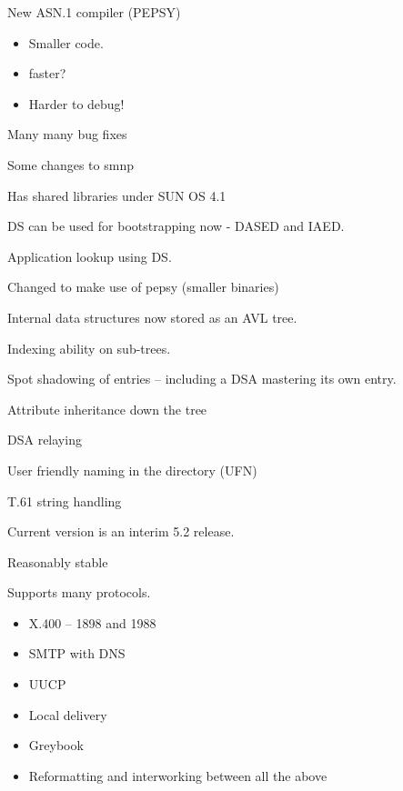 \begin{bwslide}
\begin{nrtc}
\item	New ASN.1 compiler (PEPSY)
	\begin{itemize}
	\item	Smaller code.
	\item	faster?
	\item Harder to debug!
	\end{itemize}
\item	Many many bug fixes
\item	Some changes to smnp
\item	Has shared libraries under SUN OS 4.1
\item	DS can be used for bootstrapping now - DASED and IAED.
\item	Application lookup using DS.
\end{nrtc}
\end{bwslide}

\begin{bwslide}
\begin{nrtc}
\item	Changed to make use of pepsy (smaller binaries)
\item	Internal data structures now stored as an AVL tree.
\item	Indexing ability on sub-trees.
\item	Spot shadowing of entries -- including a DSA mastering its own entry.
\item	Attribute inheritance down the tree
\item	DSA relaying
\item	User friendly naming in the directory (UFN)
\item	T.61 string handling
\end{nrtc}
\end{bwslide}

\begin{bwslide}
\begin{nrtc}
\item	Current version is an interim 5.2 release.
\item	Reasonably stable
\item	Supports many protocols.
	\begin{itemize}
	\item	X.400 -- 1898 and 1988
	\item	SMTP with DNS
	\item	UUCP
	\item	Local delivery
	\item	Greybook
	\item	Reformatting and interworking between all the above
	\end{itemize}
\end{nrtc}
\end{bwslide}

